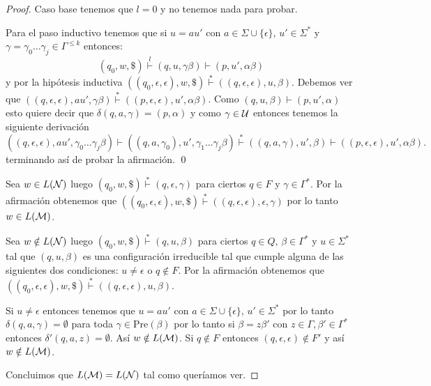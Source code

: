 \documentclass[tesis.tex]{subfiles}
\begin{document}
\begin{proof}
	Caso base tenemos que $l=0$ y no tenemos nada para probar. 

	Para el paso inductivo tenemos que si $u = au'$ con $a \in \Sigma \cup \{ \epsilon \}$, $u' \in \Sigma^{*}$ y $\gamma = \gamma_{0}\dots \gamma_{j} \in \Gamma^{\le k}$ entonces:
	\[
		(q_{0},w,\$) \overset{l}{\vdash} (q,u, \gamma \beta) 
		\vdash (p,u',\alpha \beta)	
	\] 
	y por la hipótesis inductiva 
	$((q_{0},\epsilon,\epsilon), w, \$) \overset{*}{\vdash} 
	((q,\epsilon,\epsilon), u, \beta)$.
	Debemos ver que $((q,\epsilon,\epsilon), au', \gamma \beta) 
	\overset{*}{\vdash} ((p,\epsilon,\epsilon),u',\alpha\beta)$.
	Como $(q,u, \beta) \vdash (p,u',\alpha)$ esto quiere decir que 
	$\delta(q,a,\gamma) = (p,\alpha)$ y como $\gamma \in {\cal U}$ entonces tenemos la siguiente derivación
	\[
		((q,\epsilon,\epsilon), au', \gamma_{0} \dots \gamma_{j}\beta) \vdash ((q,a,\gamma_{0}),u',\gamma_{1} \dots \gamma_{j}\beta) \overset{*}{\vdash} ((q,a,\gamma),u',\beta) 
		\vdash 	((p,\epsilon,\epsilon),u',\alpha \beta).
	\]
	terminando así de probar la afirmación. \qed

	Sea $w \in L({\cal N})$ luego $(q_{0},w,\$) \overset{*}{\vdash} 
	(q,\epsilon, \gamma)$ para ciertos $q \in F$ y $\gamma \in \Gamma^{*}$.
	Por la afirmación obtenemos que $((q_{0},\epsilon, \epsilon),w,\$) \overset{*}{\vdash} ((q,\epsilon,\epsilon),\epsilon,\gamma)$ por lo tanto $w \in L({\cal M})$.

	Sea $w \notin L({\cal N})$ luego $(q_{0},w,\$) \overset{*}{\vdash} 
	(q,u, \beta)$ para ciertos $q \in Q$, $\beta \in \Gamma^{*}$ y $u \in \Sigma^{*}$ tal que $(q,u, \beta)$ es una configuración irreducible tal que cumple alguna de las siguientes dos condiciones: 
	$u \neq \epsilon$ o $q \notin F$.
	Por la afirmación obtenemos que $((q_{0},\epsilon, \epsilon),w,\$) \overset{*}{\vdash} ((q,\epsilon,\epsilon),u,\beta)$.


	Si $u \neq \epsilon$ entonces tenemos que 
	$u = a u'$ con $a \in \Sigma \cup \{ \epsilon	\}$, $u' \in \Sigma^{*}$ 
	por lo tanto $\delta(q,a,\gamma) = \emptyset$ para toda $\gamma \in \text{Pre}(\beta)$ por lo tanto si $\beta = z \beta'$ con $z \in \Gamma, \beta' \in \Gamma^{*}$ entonces $\delta'(q,a,z) = \emptyset$.
	Así $w \notin L({\cal M})$.
	Si $q \notin F$ entonces $(q,\epsilon,\epsilon) \notin F'$ y así $w \notin L({\cal M})$.

	Concluimos que $L({\cal M}) = L({\cal N})$ tal como queríamos ver.
\end{proof}
\end{document}
